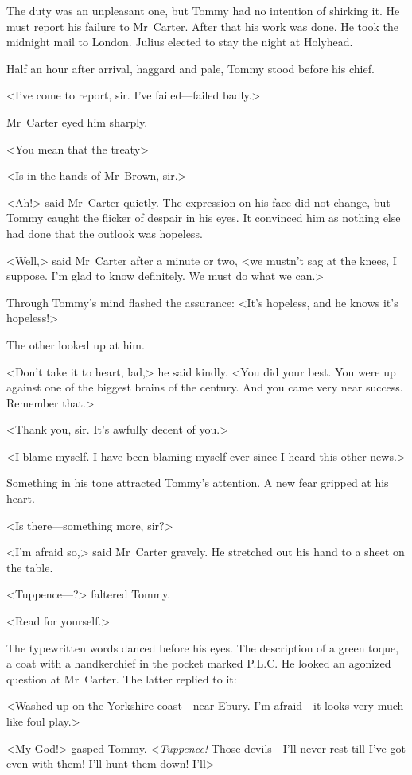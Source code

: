 The duty was an unpleasant one, but Tommy had no intention of shirking it. He must report his failure to Mr~Carter. After that his work was done. He took the midnight mail to London. Julius elected to stay the night at Holyhead.

Half an hour after arrival, haggard and pale, Tommy stood before his chief.

<I've come to report, sir. I've failed—failed badly.>

Mr~Carter eyed him sharply.

<You mean that the treaty\longdash>

<Is in the hands of Mr~Brown, sir.>

<Ah!> said Mr~Carter quietly. The expression on his face did not change, but Tommy caught the flicker of despair in his eyes. It convinced him as nothing else had done that the outlook was hopeless.

<Well,> said Mr~Carter after a minute or two, <we mustn't sag at the knees, I suppose. I'm glad to know definitely. We must do what we can.>

Through Tommy's mind flashed the assurance: <It's hopeless, and he knows it's hopeless!>

The other looked up at him.

<Don't take it to heart, lad,> he said kindly. <You did your best. You were up against one of the biggest brains of the century. And you came very near success. Remember that.>

<Thank you, sir. It's awfully decent of you.>

<I blame myself. I have been blaming myself ever since I heard this other news.>

Something in his tone attracted Tommy's attention. A new fear gripped at his heart.

<Is there—something more, sir?>

<I'm afraid so,> said Mr~Carter gravely. He stretched out his hand to a sheet on the table.

<Tuppence—?> faltered Tommy.

<Read for yourself.>

The typewritten words danced before his eyes. The description of a green toque, a coat with a handkerchief in the pocket marked P.L.C. He looked an agonized question at Mr~Carter. The latter replied to it:

<Washed up on the Yorkshire coast—near Ebury. I'm afraid—it looks very much like foul play.>

<My God!> gasped Tommy. <\emph{Tuppence!} Those devils—I'll never rest till I've got even with them! I'll hunt them down! I'll\longdash>


